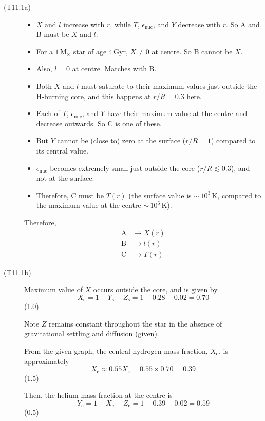 \begin{description}
\item[(T11.1a)]\mbox{}
  \begin{itemize}
  \item $X$ and $l$ increase with $r$, while $T$, $\epsilon_{\mathrm{nuc}}$,
    and $Y$ decrease with $r$. So A and B must be $X$ and $l$.
  \item For a $1\,\mathrm{M_\odot}$ star of age 4\,Gyr, $X \neq 0$ at centre.
    So B cannot be $X$.
  \item Also, $l = 0$ at centre. Matches with B.
  \item Both $X$ and $l$ must saturate to their maximum values just outside
    the H-burning core, and this happens at $r/R = 0.3$ here.
  \item Each of $T$, $\epsilon_{\mathrm{nuc}}$, and $Y$ have their maximum
    value at the centre and decrease outwards. So C is one of these.
  \item But $Y$ cannot be (close to) zero at the surface ($r/R = 1$) compared
    to its central value.
  \item $\epsilon_{\mathrm{nuc}}$ becomes extremely small just outside the
    core ($r/R \lesssim 0.3$), and not at the surface.
  \item Therefore, C must be $T(r)$ (the surface value is
    ${\sim}\,10^3$\,K, compared to the maximum value at the centre
    ${\sim}\,10^6$\,K).
  \end{itemize}
  Therefore,
  \begin{align*}
    \mathrm{A} &\longrightarrow X(r) \tag*{(2.0)}\\
    \mathrm{B} &\longrightarrow l(r) \tag*{(2.0)}\\
    \mathrm{C} &\longrightarrow T(r) \tag*{(2.0)}
  \end{align*}

\item[(T11.1b)] Maximum value of $X$ occurs outside the core, and is given by
  \[
    X_{\mathrm{s}} = 1 - Y_{\mathrm{s}} - Z_{\mathrm{s}}
    = 1 - 0.28 - 0.02 = 0.70
  \]
  \hfill(1.0)

  Note $Z$ remains constant throughout the star in the absence of
  gravitational settling and diffusion (given).

  From the given graph, the central hydrogen mass fraction, $X_{\mathrm{c}}$,
  is approximately
  \[
    X_{\mathrm{c}} \approx 0.55 X_{\mathrm{s}} = 0.55 \times 0.70 = 0.39
  \]
  \hfill(1.5)

  Then, the helium mass fraction at the centre is
  \[
    Y_{\mathrm{c}} = 1 - X_{\mathrm{c}} - Z_{\mathrm{c}}
    = 1 - 0.39 - 0.02 = 0.59
  \]
  \hfill(0.5)


\end{description}
